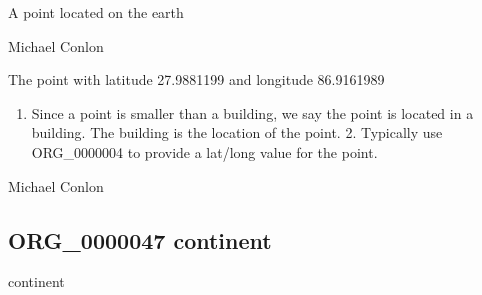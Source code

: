 \documentclass[letterpaper,10pt,english]{sphinxmanual}
\begin{document}
\begin{sphinxShadowBox}

\sphinxAtStartPar
A point located on the earth
\end{sphinxShadowBox}

\begin{sphinxShadowBox}

\sphinxAtStartPar
Michael Conlon 
\end{sphinxShadowBox}

\begin{sphinxShadowBox}

\sphinxAtStartPar
The point with latitude 27.9881199 and longitude 86.9161989
\end{sphinxShadowBox}

\begin{sphinxShadowBox}
\begin{enumerate}
%
\item {} 
\sphinxAtStartPar
Since a point is smaller than a building, we say the point is located in a building.  The building is the location of the point.  2. Typically use ORG\_0000004 to provide a lat/long value for the point.

\end{enumerate}
\end{sphinxShadowBox}

\begin{sphinxShadowBox}

\sphinxAtStartPar
Michael Conlon 
\end{sphinxShadowBox}
\begin{quote}

\ignorespaces \end{quote}


\subsection{ORG\_0000047 \sphinxhyphen{} continent}
\label{\detokenize{doc-ORG_0000047:org-0000047-continent}}\label{\detokenize{doc-ORG_0000047:index-0}}\label{\detokenize{doc-ORG_0000047::doc}}
\begin{sphinxShadowBox}

\sphinxAtStartPar
continent
\end{sphinxShadowBox}
\end{document}
